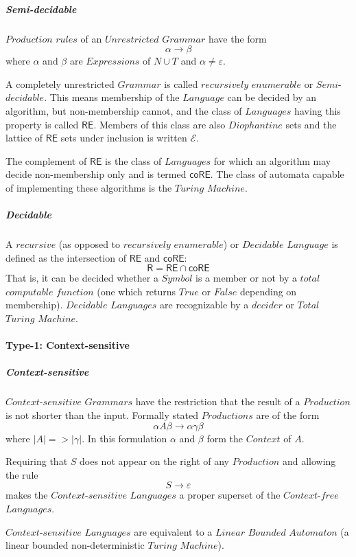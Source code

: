 \documentclass{article}
\begin{document}
    \subparagraph{Semi-decidable}
    $Production$ $rules$ of an $Unrestricted$ $Grammar$ have the form
    \[
        \alpha \rightarrow \beta
    \]
    where $\alpha$ and $\beta$ are $Expressions$ of $N \cup T$ and
    $\alpha \neq \varepsilon$.

    A completely unrestricted $Grammar$ is called $recursively$
    $enumerable$ or $Semi$-$decidable$. This means membership of the
    $Language$ can be decided by an algorithm, but non-membership
    cannot, and the class of $Languages$ having this property is
    called $\mathsf{RE}$. Members of this class are also $Diophantine$
    sets and the lattice of $\mathsf{RE}$ sets under inclusion is
    written $\mathcal{E}$.

    The complement of $\mathsf{RE}$ is the class of $Languages$ for
    which an algorithm may decide non-membership only and is termed
    $\mathsf{coRE}$. The class of automata capable of implementing
    these algorithms is the $Turing$ $Machine$.

    \subparagraph{Decidable}
    A $recursive$ (as opposed to $recursively$ $enumerable$) or
    $Decidable$ $Language$ is defined as the intersection of
    $\mathsf{RE}$ and $\mathsf{coRE}$:
    \[
        \mathsf{R} = \mathsf{RE} \cap \mathsf{coRE}
    \]
    That is, it can be decided whether a $Symbol$ is a member or not
    by a $total$ $computable$ $function$ (one which returns $True$ or
    $False$ depending on membership). $Decidable$ $Languages$ are
    recognizable by a $decider$ or $Total$ $Turing$ $Machine$.

\paragraph{Type-1: Context-sensitive}

    \subparagraph{Context-sensitive}
    $Context$-$sensitive$ $Grammars$ have the restriction that the
    result of a $Production$ is not shorter than the input. Formally
    stated $Productions$ are of the form
    \[
        \alpha A \beta \rightarrow \alpha \gamma \beta
    \]
    where $|A| => |\gamma|$. In this formulation $\alpha$ and $\beta$
    form the $Context$ of $A$.

    Requiring that $S$ does not appear on the right of any
    $Production$ and allowing the rule
    \[
        S \rightarrow \varepsilon
    \]
    makes the $Context$-$sensitive$ $Languages$ a proper superset of the
    $Context$-$free$ $Languages$.

    $Context$-$sensitive$ $Languages$ are equivalent to a $Linear$
    $Bounded$ $Automaton$ (a linear bounded non-deterministic $Turing$
    $Machine$).
\end{document}

